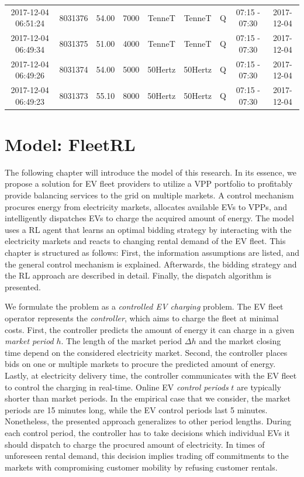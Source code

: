 \documentclass[a4paper, 12pt]{article}
\begin{document}
{\begin{table}
\begin{tabular}{c|cccccccc}
2017-12-04 06:51:24 & 8031376 & 54.00 & 7000 & TenneT & TenneT & Q & 07:15 - 07:30 & 2017-12-04\\
2017-12-04 06:49:34 & 8031375 & 51.00 & 4000 & TenneT & TenneT & Q & 07:15 - 07:30 & 2017-12-04\\
2017-12-04 06:49:26 & 8031374 & 54.00 & 5000 & 50Hertz & 50Hertz & Q & 07:15 - 07:30 & 2017-12-04\\
2017-12-04 06:49:23 & 8031373 & 55.10 & 8000 & 50Hertz & 50Hertz & Q & 07:15 - 07:30 & 2017-12-04\\
\hline
\hline
\end{tabular}
\end{table}
}

\clearpage
\section{Model: FleetRL}
\label{sec:org37b1d70}
The following chapter will introduce the model of this research. In its essence,
we propose a solution for EV fleet providers to utilize a VPP portfolio to
profitably provide balancing services to the grid on multiple markets. A control
mechanism procures energy from electricity markets, allocates available EVs to
VPPs, and intelligently dispatches EVs to charge the acquired amount of energy.
The model uses a RL agent that learns an optimal bidding strategy by interacting
with the electricity markets and reacts to changing rental demand of the EV
fleet. This chapter is structured as follows: First, the information assumptions
are listed, and the general control mechanism is explained. Afterwards, the
bidding strategy and the RL approach are described in detail. Finally, the
dispatch algorithm is presented.

We formulate the problem as a \emph{controlled EV charging} problem. The EV fleet
operator represents the \emph{controller}, which aims to charge the fleet at minimal
costs. First, the controller predicts the amount of energy it can charge in a
given \emph{market period} \(h\). The length of the market period \(\Delta h\) and the
market closing time depend on the considered electricity market. Second, the
controller places bids on one or multiple markets to procure the predicted
amount of energy. Lastly, at electricity delivery time, the controller
communicates with the EV fleet to control the charging in real-time. Online EV
\emph{control periods} \(t\) are typically shorter than market periods. In the
empirical case that we consider, the market periods are 15 minutes long, while
the EV control periods last 5 minutes. Nonetheless, the presented approach
generalizes to other period lengths. During each control period, the controller
has to take decisions which individual EVs it should dispatch to charge the
procured amount of electricity. In times of unforeseen rental demand, this
decision implies trading off commitments to the markets with compromising
customer mobility by refusing customer rentals.
\end{document}
